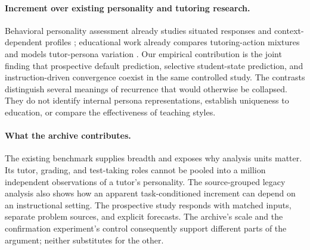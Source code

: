 \paragraph{Increment over existing personality and tutoring research.}
Behavioral personality assessment already studies situated responses and
context-dependent profiles \citep{lee2025trait,liu2026bma}; educational work
already compares tutoring-action mixtures and models tutor-persona variation
\citep{kucheria2025cima,lee2026tutorpersonas}. Our empirical contribution is the
joint finding that prospective default prediction, selective student-state
prediction, and instruction-driven convergence coexist in the same controlled
study. The contrasts distinguish several meanings of recurrence that would
otherwise be collapsed. They do not identify internal persona representations,
establish uniqueness to education, or compare the effectiveness of teaching
styles.

\paragraph{What the archive contributes.}
The existing benchmark supplies breadth and exposes why analysis units matter.
Its tutor, grading, and test-taking roles cannot be pooled into a million
independent observations of a tutor's personality. The source-grouped legacy
analysis also shows how an apparent task-conditioned increment can depend on
an instructional setting. The prospective study responds with matched inputs,
separate problem sources, and explicit forecasts. The archive's scale and the
confirmation experiment's control consequently support different parts of the
argument; neither substitutes for the other.
